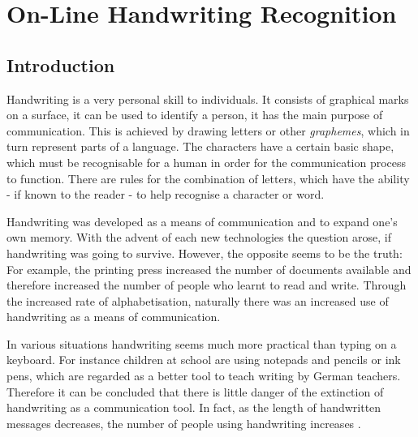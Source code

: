 

\chapter{On-Line Handwriting Recognition}
\label{chap:onlinehwr}


\section{Introduction}
\label{sec:onlinehwrintroduction}


Handwriting is a very personal skill to individuals. It consists of graphical
marks on a surface, it can be used to identify a person, it has the main
purpose of communication. This is achieved by drawing letters or other 
\emph{graphemes}, which in turn represent parts of a language.
The characters have a certain basic shape, which must be recognisable
for a human in order for the communication process to function.
There are rules for the combination of letters, which have the ability - if
known to the reader - to help recognise a character or word.

Handwriting was developed as a means of communication and to expand one's own
memory. With the advent of each new technologies the question arose, 
if handwriting was going to survive. However, the opposite seems to be the 
truth: For example, the printing press increased the number of documents
available and therefore increased the number of people who learnt to read
and write. Through the increased rate of alphabetisation, naturally there was
an increased use of handwriting as a means of communication.

In various situations handwriting seems much more practical than typing on a
keyboard. For instance children at school are using notepads and pencils or
ink pens, which are regarded as a better tool to teach writing by German 
teachers. Therefore it can be concluded that there is little danger of
the extinction of handwriting as a communication tool. In fact, as 
the length of handwritten messages decreases, the number of people using 
handwriting increases .

